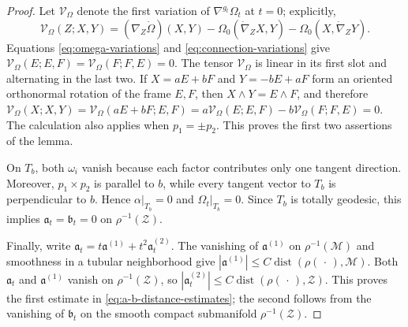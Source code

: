 \documentclass[10pt,a4paper]{amsart}
\newcommand{\cM}{\mathcal M}
\newcommand{\cZ}{\mathcal Z}
\newcommand{\dist}{\operatorname{dist}}
\begin{document}
\begin{proof}
Let $\mathcal V_\Omega$ denote the first variation of
$\nabla^{g_t}\Omega_t$ at $t=0$; explicitly,
\[
 \mathcal V_\Omega(Z;X,Y)=(\nabla_Z\dot\Omega)(X,Y)
 -\Omega_0(\dot{\nabla}_Z X,Y)-\Omega_0(X,\dot{\nabla}_Z Y).
\]
Equations \eqref{eq:omega-variations} and \eqref{eq:connection-variations} give
$\mathcal V_\Omega(E;E,F)=\mathcal V_\Omega(F;F,E)=0$.
The tensor $\mathcal V_\Omega$ is linear in its first slot and alternating in the last two.
If $X=aE+bF$ and $Y=-bE+aF$ form an oriented orthonormal rotation
of the frame $E,F$, then $X\wedge Y=E\wedge F$, and therefore
$\mathcal V_\Omega(X;X,Y)=\mathcal V_\Omega(aE+bF;E,F)
=a\mathcal V_\Omega(E;E,F)-b\mathcal V_\Omega(F;F,E)=0$.
The calculation also applies when $p_1=\pm p_2$.  This proves the first two
assertions of the lemma.

On $T_b$, both $\omega_i$ vanish because each factor contributes only
one tangent direction.  Moreover, $p_1\times p_2$ is parallel to $b$,
while every tangent vector to $T_b$ is perpendicular to $b$.  Hence
$\alpha|_{T_b}=0$ and $\Omega_t|_{T_b}=0$.  Since $T_b$ is totally geodesic,
this implies $\mathfrak a_t=\mathfrak b_t=0$ on $\rho^{-1}(\cZ)$.

Finally, write
$\mathfrak a_t=t\mathfrak a^{(1)}+t^2\mathfrak a^{(2)}_t$.
The vanishing of $\mathfrak a^{(1)}$ on $\rho^{-1}(\cM)$ and smoothness in a
tubular neighborhood give
$|\mathfrak a^{(1)}|\leq C\dist(\rho(\,\cdot\,),\cM)$.  Both
$\mathfrak a_t$ and $\mathfrak a^{(1)}$ vanish on
$\rho^{-1}(\cZ)$, so
$|\mathfrak a^{(2)}_t|\leq C\dist(\rho(\,\cdot\,),\cZ)$.  This proves the
first estimate in \eqref{eq:a-b-distance-estimates}; the second follows from
the vanishing of $\mathfrak b_t$ on the smooth compact submanifold
$\rho^{-1}(\cZ)$.
\end{proof}
\end{document}
